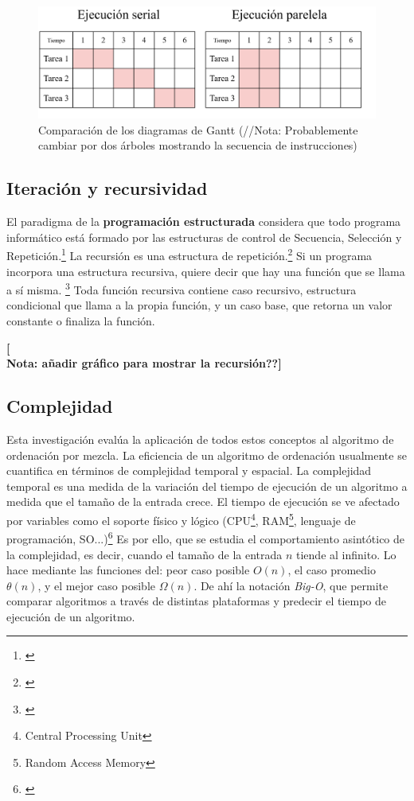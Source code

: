 \documentclass[titlepage]{article}
\begin{document}

\begin{figure}
    \centering
    \includegraphics[width=0.65\linewidth]{Diagrames/serialVsParallel.png}
    \caption{Comparación de los diagramas de Gantt (//Nota: Probablemente cambiar por dos árboles mostrando la secuencia de instrucciones)}
    \label{fig:serialVsParallel}
\end{figure}

\subsection{Iteración y recursividad}
El paradigma de la \textbf{programación estructurada} considera que todo programa informático está formado por las estructuras de control de Secuencia, Selección y Repetición.\footnote{\cite{extended-learning-institute-no-date}} La recursión es una estructura de repetición.\footnote{\cite{wellesley-college-2000}} Si un programa incorpora una estructura recursiva, quiere decir que hay una función que se llama a sí misma. \footnote{\cite{bhargava-2016}} Toda función recursiva contiene caso recursivo, estructura condicional que llama a la propia función, y un caso base,  que retorna un valor constante o finaliza la función. 


\textbf{[\\Nota: añadir gráfico para mostrar la recursión??]}

\subsection{Complejidad}
Esta investigación evalúa la aplicación de todos estos conceptos al algoritmo de ordenación por mezcla. La eficiencia de un algoritmo de ordenación usualmente se cuantifica en términos de complejidad temporal y espacial. La complejidad temporal es una medida de la variación del tiempo de ejecución de un algoritmo a medida que el tamaño de la entrada crece. El tiempo de ejecución se ve afectado por variables como el soporte físico y lógico (CPU\footnote{Central Processing Unit}, RAM\footnote{Random Access Memory}, lenguaje de programación, SO...)\footnote{\cite{Heineman2008-mw}} Es por ello, que se estudia el comportamiento asintótico de la complejidad, es decir, cuando el tamaño de la entrada $n$ tiende al infinito. Lo hace mediante las funciones del: peor caso posible \(O(n)\), el caso promedio \(\theta(n)\), y el mejor caso posible \(\Omega(n)\). \footnotemark[8] De ahí la notación \textit{Big-O}, que permite comparar algoritmos a través de distintas plataformas y predecir el tiempo de ejecución de un algoritmo.
\end{document}
